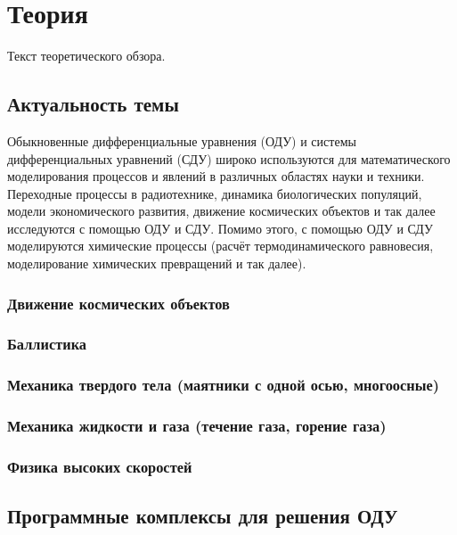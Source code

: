 \section{Теория}

Текст теоретического обзора.

\subsection{Актуальность темы}

Обыкновенные дифференциальные уравнения (ОДУ) и системы дифференциальных уравнений (СДУ) широко используются для математического моделирования процессов и явлений в различных областях науки и техники. Переходные процессы в радиотехнике, динамика биологических популяций, модели экономического развития, движение космических объектов и так далее исследуются с помощью ОДУ и СДУ. Помимо этого, с помощью ОДУ и СДУ моделируются химические процессы (расчёт термодинамического равновесия, моделирование химических превращений и так далее).

\subsubsection{Движение космических объектов}

\subsubsection{Баллистика}

\subsubsection{Механика твердого тела (маятники с одной осью, многоосные)}

\subsubsection{Механика жидкости и газа (течение газа, горение газа)}

\subsubsection{Физика высоких скоростей}


\subsection{Программные комплексы для решения ОДУ}

